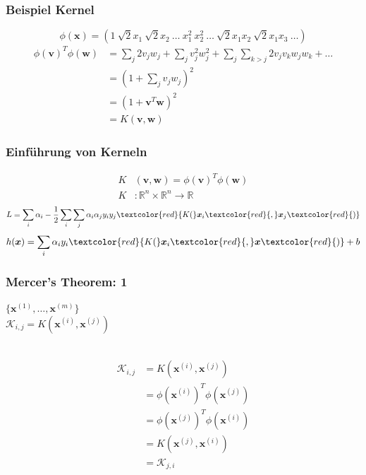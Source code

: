 	\begin{frame}
		\frametitle{Beispiel Kernel}
			\begin{equation*}
				\phi(\boldsymbol{x}) = (1 \ \sqrt{2}x_{1} \ \sqrt{2}x_{2} \ \dots \ x_{1}^{2} \ x_{2}^{2} \ \dots \ \sqrt{2}x_{1}x_{2} \ \sqrt{2}x_{1}x_{3} \ \dots)
			\end{equation*}
			\pause
			\begin{align*}
				\phi(\boldsymbol{v})^{T}\phi(\boldsymbol{w}) &= \sum_{j} 2v_{j}w_{j} + \sum_{j} v_{j}^{2} w_{j}^{2} + \sum_{j} \sum_{k > j} 2 v_{j} v_{k} w_{j} w_{k} + \dots \\
						&= (1+\sum_{j} v_{j} w_{j})^{2} \\
						&= (1+\boldsymbol{v}^{T} \boldsymbol{w})^{2} \\
						&= K(\boldsymbol{v}, \boldsymbol{w})
			\end{align*}
	\end{frame}
	
	\begin{frame}
		\frametitle{Einführung von Kerneln}
			\begin{align*}
				K&(\boldsymbol{v}, \boldsymbol{w}) = \phi(\boldsymbol{v})^{T} \phi(\boldsymbol{w})\\
				K&: \mathbb{R}^n \times \mathbb{R}^n \rightarrow \mathbb{R}
			\end{align*}
			\pause
			\begin{equation*}
				L = \sum_i \alpha_i - \frac{1}{2} \sum_i \sum_j \alpha_i \alpha_j y_i y_j \textcolor{red}{K(}\boldsymbol{x}_i\textcolor{red}{,} \boldsymbol{x}_j\textcolor{red}{)}
			\end{equation*}
			\begin{equation*}
				h(\boldsymbol{x}) = \sum_i \alpha_i y_i \textcolor{red}{K(}\boldsymbol{x}_i\textcolor{red}{,} \boldsymbol{x}\textcolor{red}{)} + b
			\end{equation*}
	\end{frame}
	
	\begin{frame}
		\frametitle{Mercer's Theorem: 1}
			$\{ \boldsymbol{x}^{(1)}, \dots, \boldsymbol{x}^{(m)} \}$ \\
			$\mathcal{K}_{i,j} = K(\boldsymbol{x}^{(i)}, \boldsymbol{x}^{(j)})$ \\\
			\pause
			
			\begin{align*}
				\mathcal{K}_{i,j} &= K(\boldsymbol{x}^{(i)}, \boldsymbol{x}^{(j)}) \\
								  &= \phi(\boldsymbol{x}^{(i)})^{T} \phi(\boldsymbol{x}^{(j)}) \\
								  &= \phi(\boldsymbol{x}^{(j)})^{T} \phi(\boldsymbol{x}^{(i)}) \\
								  &= K(\boldsymbol{x}^{(j)}, \boldsymbol{x}^{(i)}) \\
								  &= \mathcal{K}_{j,i}
			\end{align*}
	\end{frame}
	
